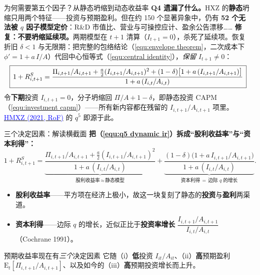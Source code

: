 \documentclass{beamer}
\begin{document}
\begin{frame}{为何需要第五个因子？从静态坍缩到动态收益率}
	\textbf{Q4 遗漏了什么。}HXZ 的\textbf{静态}坍缩只用两个特征——投资与预期盈利。但在约 150 个显著异象中，仍有 \textbf{52 个无法被 $q$ 因子模型定价}：R\&D 市值比、营业与可操控应计、盈余公告漂移……
	\vspace{2pt}
	\textbf{修复：不要坍缩延续项。}两期模型在 $t+1$ 清算（$I_{t+1}=0$），杀死了延续项。恢复折旧 $\delta<1$ 与无限期：把完整的包络结论（\ref{equ:envelope theorem}，二次成本下 $\phi'=1+a\,I/A$）代回中心恒等式（\ref{equ:central identity}），\textit{保留} $I_{t+1}\neq0$：
	\begin{equation}\label{equ:q5 dynamic ir}
		\resizebox{\linewidth}{!}{$\displaystyle
		\boxed{\,1+R^S_{i,t+1}=\frac{\Pi_{i,t+1}/A_{i,t+1}+\tfrac a2(I_{i,t+1}/A_{i,t+1})^2+(1-\delta)\big[1+a\,(I_{i,t+1}/A_{i,t+1})\big]}{1+a\,(I_{i,t}/A_{i,t})}\,}
		$}
	\end{equation}
	{\footnotesize 令\textbf{下期}投资 $I_{i,t+1}=0$，分子坍缩回 $\Pi/A+1-\delta$，即静态投资 CAPM（\ref{equ:investment capm}）——所有新内容都在残留的 $I_{i,t+1}/A_{i,t+1}$ 项里。} \href{https://doi.org/10.1093/rof/rfaa004}{\textcolor{blue}{HMXZ (2021, RoF)}} 的 $q^5$ 即源于此。
\end{frame}

\begin{frame}{三个决定因素：解读横截面}
	\textbf{把（\ref{equ:q5 dynamic ir}）拆成“股利收益率”与“资本利得”：}
	\[
		1+R^S_{i,t+1}=\underbrace{\frac{\Pi_{i,t+1}/A_{i,t+1}+\tfrac a2(I_{i,t+1}/A_{i,t+1})^2}{1+a\,(I_{i,t}/A_{i,t})}}_{\text{股利收益率}\,\approx\,\text{静态模型}}+\underbrace{\frac{(1-\delta)\big(1+a\,I_{i,t+1}/A_{i,t+1}\big)}{1+a\,(I_{i,t}/A_{i,t})}}_{\text{资本利得}\,=\,\text{边际 }q\text{ 的增长}}.
	\]
	\begin{itemize}
		\item \textbf{股利收益率}——平方项在经济上极小，故这一块复刻了静态的\textbf{投资}与\textbf{盈利}两渠道。
		\item \textbf{资本利得}——边际 $q$ 的增长，近似正比于\textbf{投资率增长} $\dfrac{I_{i,t+1}/A_{i,t+1}}{I_{i,t}/A_{i,t}}$（Cochrane 1991）。
	\end{itemize}
	\begin{block}{预期收益率现在有\emph{三个}决定因素}
		它随（i）\textbf{低}投资 $I_{it}/A_{it}$、（ii）\textbf{高}预期盈利 $\mathrm{E}_t[\Pi_{i,t+1}/A_{i,t+1}]$、以及如今的（iii）\textbf{高}预期投资增长而上升。
	\end{block}
\end{frame}
\end{document}
